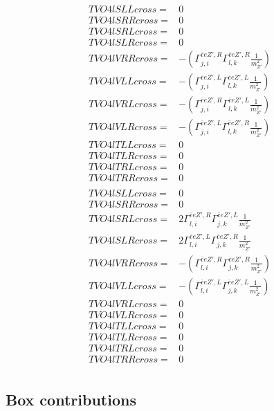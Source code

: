 \documentclass[A4,landscape]{article}
\begin{document}
\begin{align} 
  TVO4lSLLcross= & 0 \\ 
  TVO4lSRRcross= & 0 \\ 
  TVO4lSRLcross= & 0 \\ 
  TVO4lSLRcross= & 0 \\ 
  TVO4lVRRcross= & -(\Gamma^{\bar{e}e {Z'} ,R}_{j, i} \Gamma^{\bar{e}e {Z'} ,R}_{l, k} \frac{1}{m^2_{{Z'}}}) \\ 
  TVO4lVLLcross= & -(\Gamma^{\bar{e}e {Z'} ,L}_{j, i} \Gamma^{\bar{e}e {Z'} ,L}_{l, k} \frac{1}{m^2_{{Z'}}}) \\ 
  TVO4lVRLcross= & -(\Gamma^{\bar{e}e {Z'} ,R}_{j, i} \Gamma^{\bar{e}e {Z'} ,L}_{l, k} \frac{1}{m^2_{{Z'}}}) \\ 
  TVO4lVLRcross= & -(\Gamma^{\bar{e}e {Z'} ,L}_{j, i} \Gamma^{\bar{e}e {Z'} ,R}_{l, k} \frac{1}{m^2_{{Z'}}}) \\ 
  TVO4lTLLcross= & 0 \\ 
  TVO4lTLRcross= & 0 \\ 
  TVO4lTRLcross= & 0 \\ 
  TVO4lTRRcross= & 0 \\ 
\end{align} 
\begin{align} 
  TVO4lSLLcross= & 0 \\ 
  TVO4lSRRcross= & 0 \\ 
  TVO4lSRLcross= & 2 \Gamma^{\bar{e}e {Z'} ,R}_{l, i} \Gamma^{\bar{e}e {Z'} ,L}_{j, k} \frac{1}{m^2_{{Z'}}} \\ 
  TVO4lSLRcross= & 2 \Gamma^{\bar{e}e {Z'} ,L}_{l, i} \Gamma^{\bar{e}e {Z'} ,R}_{j, k} \frac{1}{m^2_{{Z'}}} \\ 
  TVO4lVRRcross= & -(\Gamma^{\bar{e}e {Z'} ,R}_{l, i} \Gamma^{\bar{e}e {Z'} ,R}_{j, k} \frac{1}{m^2_{{Z'}}}) \\ 
  TVO4lVLLcross= & -(\Gamma^{\bar{e}e {Z'} ,L}_{l, i} \Gamma^{\bar{e}e {Z'} ,L}_{j, k} \frac{1}{m^2_{{Z'}}}) \\ 
  TVO4lVRLcross= & 0 \\ 
  TVO4lVLRcross= & 0 \\ 
  TVO4lTLLcross= & 0 \\ 
  TVO4lTLRcross= & 0 \\ 
  TVO4lTRLcross= & 0 \\ 
  TVO4lTRRcross= & 0 \\ 
\end{align} 
\subsection{Box contributions} 
\end{document}
